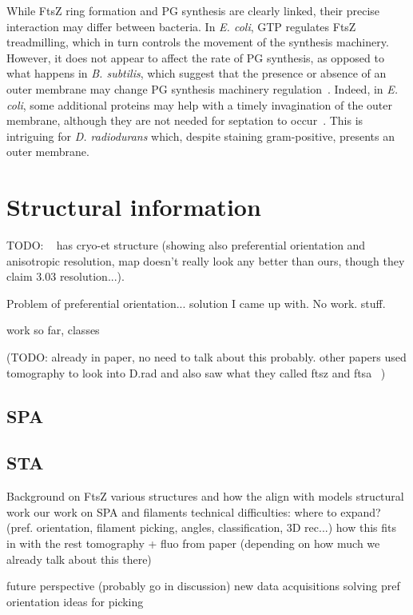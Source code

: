 While FtsZ ring formation and PG synthesis are clearly linked, their precise interaction may differ between bacteria.
In \textit{E. coli}, GTP regulates FtsZ treadmilling, which in turn controls the movement of the synthesis machinery.
However, it does not appear to affect the rate of PG synthesis, as opposed to what happens in \textit{B. subtilis}, which suggest that the presence or absence of an outer membrane may change PG synthesis machinery regulation~\cite{yangGTPaseActivityCoupled2017}.
Indeed, in \textit{E. coli}, some additional proteins may help with a timely invagination of the outer membrane, although they are not needed for septation to occur~\cite{gerdingTransenvelopeTolPal2007}.
This is intriguing for \textit{D. radiodurans} which, despite staining gram-positive, presents an outer membrane.

\section{Structural information}

TODO: ~\citet{fujitaStructuresFtsZSingle2023} has cryo-et structure (showing also preferential orientation and anisotropic resolution, map doesn't really look any better than ours, though they claim 3.03 resolution...).

Problem of preferential orientation... solution I came up with. No work. stuff.

work so far, classes

(TODO: already in paper, no need to talk about this probably. other papers used tomography to look into D.rad and also saw what they called ftsz and ftsa ~\cite{sextonSuperresolutionConfocalCryoCLEM2022})

\subsection{SPA}

\subsection{STA}

\begin{outline}
\1 Background on FtsZ
    \2 various structures and how the align with models
\1 structural work
    \2 our work on SPA and filaments
        \3 technical difficulties: where to expand? (pref. orientation, filament picking, angles, classification, 3D rec...)
    \2 how this fits in with the rest
    \2 tomography + fluo from paper (depending on how much we already talk about this there)

\1 future perspective (probably go in discussion)
    \2 new data acquisitions
    \2 solving pref orientation
    \2 ideas for picking
\end{outline}
